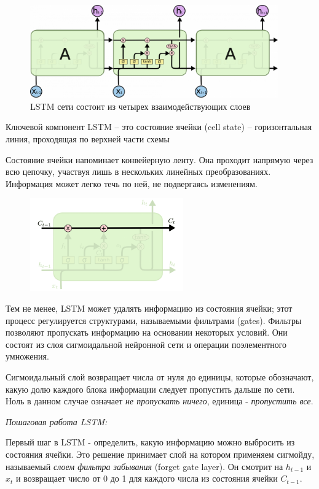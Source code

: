 	\begin{figure}[ht!]
		\centering
		\captionsetup{justification=centering}
		\includegraphics[height=40mm]{img/LSTM Chain.png}
		\caption{LSTM сети состоит из четырех взаимодействующих слоев}
	\end{figure}
	
	Ключевой компонент LSTM – это состояние ячейки (cell state) – горизонтальная линия, проходящая по верхней части схемы
	
	Состояние ячейки напоминает конвейерную ленту. Она проходит напрямую через всю цепочку, участвуя лишь в нескольких линейных преобразованиях. Информация может легко течь по ней, не подвергаясь изменениям.
	
	\begin{figure}[ht!]
		\centering
		\captionsetup{justification=centering}
		\includegraphics[height=40mm]{img/LSTM 1.png}
	\end{figure}
	
	Тем не менее, LSTM может удалять информацию из состояния ячейки; этот процесс регулируется структурами, называемыми фильтрами (gates). Фильтры позволяют пропускать информацию на основании некоторых условий. Они состоят из слоя сигмоидальной нейронной сети и операции поэлементного умножения.
	
	Сигмоидальный слой возвращает числа от нуля до единицы, которые обозначают, какую долю каждого блока информации следует пропустить дальше по сети. Ноль в данном случае означает \textit{не пропускать ничего}, единица - \textit{пропустить все}.

    \textit{Пошаговая работа LSTM:}
    
    Первый шаг в LSTM - определить, какую информацию можно выбросить из состояния ячейки. Это решение принимает слой на котором применяем сигмойду, называемый \textit{слоем фильтра забывания} (forget gate layer). Он смотрит на $h_{t-1}$ и $x_t$ и возвращает число от 0 до 1 для каждого числа из состояния ячейки $C_{t-1}$.
    
